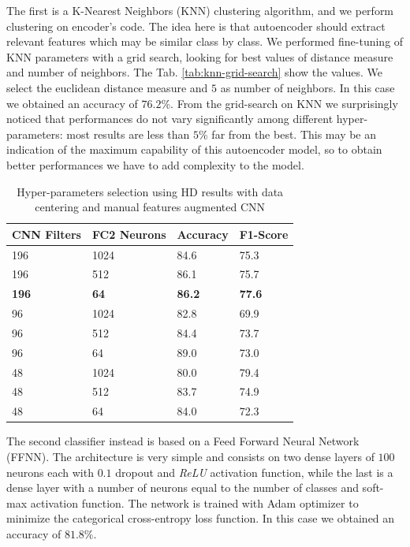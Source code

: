 The first is a K-Nearest Neighbors (KNN) clustering algorithm, and we
perform clustering on encoder's code. The idea here is that
autoencoder should extract relevant features which may be similar
class by class. We performed fine-tuning of KNN parameters with a grid
search, looking for best values of distance measure and number of
neighbors. The Tab. \ref{tab:knn-grid-search} show the values.  We
select the euclidean distance measure and $5$ as number of neighbors.
In this case we obtained an accuracy of $76.2$\%.  From the
grid-search on KNN we surprisingly noticed that performances do not
vary significantly among different hyper-parameters: most results are
less than $5$\% far from the best. This may be an indication of the
maximum capability of this autoencoder model, so to obtain better
performances we have to add complexity to the model.

\begin{table}[b]
	\centering
	\begin{tabular}{ p{1.8cm}p{1.9cm}p{1.7cm}p{1.7cm} }
		\hline
		CNN Filters & FC2 Neurons & Accuracy & F1-Score \\
		\hline
		196 & 1024 & 84.6 & 75.3 \\
		196 & 512 & 86.1 & 75.7 \\
		\textbf{196} & \textbf{64} & \textbf{86.2} & \textbf{77.6} \\
		96 & 1024 & 82.8 & 69.9 \\
		96 & 512 & 84.4 & 73.7 \\
		96 & 64 & 89.0 & 73.0 \\
		48 & 1024 & 80.0 & 79.4 \\
		48 & 512 & 83.7 & 74.9 \\
		48 & 64 & 84.0 & 72.3 \\
		\hline
	\end{tabular}
	\caption{Hyper-parameters selection using HD results with data centering and manual features augmented CNN}
	\label{tab:model-selection}
\end{table}

The second classifier instead is based on a Feed Forward Neural
Network (FFNN). The architecture is very simple and consists on two
dense layers of $100$ neurons each with $0.1$ dropout and
\textit{ReLU} activation function, while the last is a dense layer
with a number of neurons equal to the number of classes and soft-max
activation function. The network is trained with Adam optimizer to
minimize the categorical cross-entropy loss function. In this case we
obtained an accuracy of $81.8\%$.

